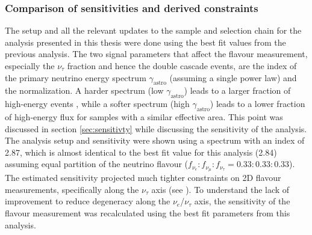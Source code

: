 \subsubsection{Comparison of sensitivities and derived constraints}
\label{sec:sens_bf}
The setup and all the relevant updates to the sample and selection chain for the analysis presented in this thesis were done using the best fit values from the previous analysis. The two signal parameters that affect the flavour measurement, especially the $\nu_{\tau}$ fraction and hence the double cascade events, are the index of the primary neutrino energy spectrum $\gamma_{\mathrm{astro}}$ (assuming a single power law) and the normalization. A harder spectrum (low $\gamma_{\mathrm{astro}}$) leads to a larger fraction of  high-energy events , while a softer spectrum (high $\gamma_{\mathrm{astro}}$) leads to a lower fraction of high-energy flux for samples with a similar effective area. This point was discussed in section \ref{sec:sensitivty} while discussing the sensitivity of the analysis. The analysis setup and sensitivity were shown using a spectrum with an index of 2.87, which is almost identical to the best fit value for this analysis (2.84) assuming equal partition of the neutrino flavour ($f_{\nu_e}:f_{\nu_{\mu}}:f_{\nu_{\tau}} = 0.33 : 0.33 : 0.33$). The estimated sensitivity projected much tighter constraints on 2D flavour measurements, specifically along the $\nu_{\tau}$ axis (see ). To understand the lack of improvement to reduce degeneracy along the $\nu_{e}$/$\nu_{\tau}$ axis, the sensitivity of the flavour measurement was recalculated using the best fit parameters from this analysis.

